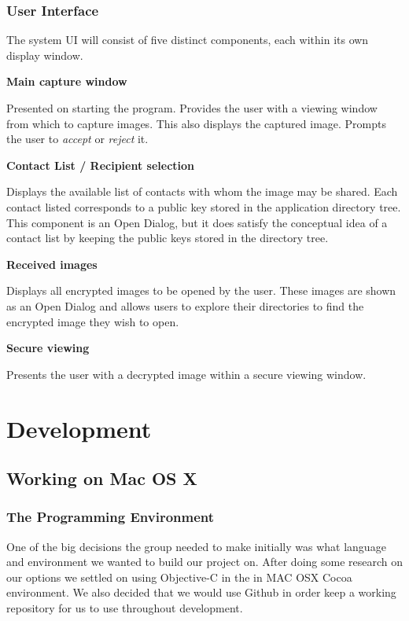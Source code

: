 \documentclass[11pt, a4paper,titlepage]{report}
\begin{document}
\subsection*{User Interface}
The system UI will consist of five distinct components, each within its own display window.
\begin{itemize*}
	\item[] \textbf{Main capture window}
		\begin{itemize*}
			\item[]  Presented on starting the program. Provides the user with a viewing window from which to capture images. This also displays the captured image. Prompts the user to \emph{accept} or \emph{reject} it.
		\end{itemize*}
	\item[] \textbf{Contact List / Recipient selection}
		\begin{itemize*}
			\item[]  Displays the available list of contacts with whom the image may be shared. Each contact listed corresponds to a public key stored in the application directory tree. This component is an Open Dialog, but it does satisfy the conceptual idea of a contact list by keeping the public keys stored in the directory tree.
		\end{itemize*}
	\item[] \textbf{Received images}
		\begin{itemize*}
			\item[]  Displays all encrypted images to be opened by the user. These images are shown as an Open Dialog and allows users to explore their directories to find the encrypted image they wish to open.
		\end{itemize*}
	\item[] \textbf{Secure viewing}
		\begin{itemize*}
			\item[]  Presents the user with a decrypted image within a secure viewing window.
		\end{itemize*}
\end{itemize*}


\chapter{Development}
\section{Working on Mac OS X}
\subsection*{The Programming Environment}
One of the big decisions the group needed to make initially was what language and environment we wanted to build our project on. After doing some research on our options we settled on using Objective-C in the in MAC OSX Cocoa environment. We also decided that we would use Github in order keep a working repository for us to use throughout development.
\end{document}
